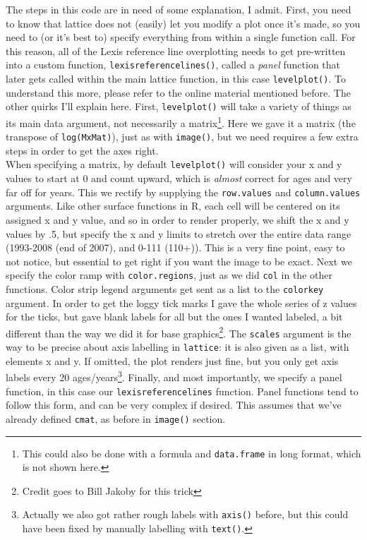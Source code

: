 \documentclass[a4paper]{article}
\begin{document}
The steps in this code are in need of some explanation, I admit. First, you need to know that lattice does not (easily) let you modify a plot once it's made, so you need to (or it's best to) specify everything from within a single function call. For this reason, all of the Lexis reference line overplotting needs to get pre-written into a custom function, \texttt{lexisreferencelines()}, called a \textit{panel} function that later gets called within the main lattice function, in this case \texttt{levelplot()}. To understand this more, please refer to the online material mentioned before. The other quirks I'll explain here. First, \texttt{levelplot()} will take a variety of things as its main data argument, not necessarily a matrix\footnote{This could also be done with a formula and \texttt{data.frame} in long format, which is not shown here.}. Here we gave it a matrix (the transpose of \texttt{log(MxMat)}), just as with \texttt{image()}, but we need requires a few extra steps in order to get the axes right.\\

When specifying a matrix, by default \texttt{levelplot()} will consider your x and y values to start at 0 and count upward, which is \textit{almost} correct for ages and very far off for years. This we rectify by supplying the \texttt{row.values} and \texttt{column.values} arguments. Like other surface functions in R, each cell will be centered on its assigned x and y value, and so in order to render properly, we shift the x and y values by .5, but specify the x and y limits to stretch over the entire data range (1993-2008 (end of 2007), and 0-111 (110+)). This is a very fine point, easy to not notice, but essential to get right if you want the image to be exact. Next we specify the color ramp with \texttt{color.regions}, just as we did \texttt{col} in the other functions. Color strip legend arguments get sent as a list to the \texttt{colorkey} argument. In order to get the loggy tick marks I gave the whole series of z values for the ticks, but gave blank labels for all but the ones I wanted labeled, a bit different than the way we did it for base graphics\footnote{Credit goes to Bill Jakoby for this trick}. The \texttt{scales} argument is the way to be precise about axis labelling in \texttt{lattice}: it is also given as a list, with elements x and y. If omitted, the plot renders just fine, but you only get axis labels every 20 ages/years\footnote{Actually we also got rather rough labels with \texttt{axis()} before, but this could have been fixed by manually labelling with \texttt{text()}.}. Finally, and most importantly, we specify a panel function, in this case our \texttt{lexisreferencelines} function. Panel functions tend to follow this form, and can be very complex if desired. This assumes that we've already defined \texttt{cmat}, as before in \texttt{image()} section.
\end{document}
